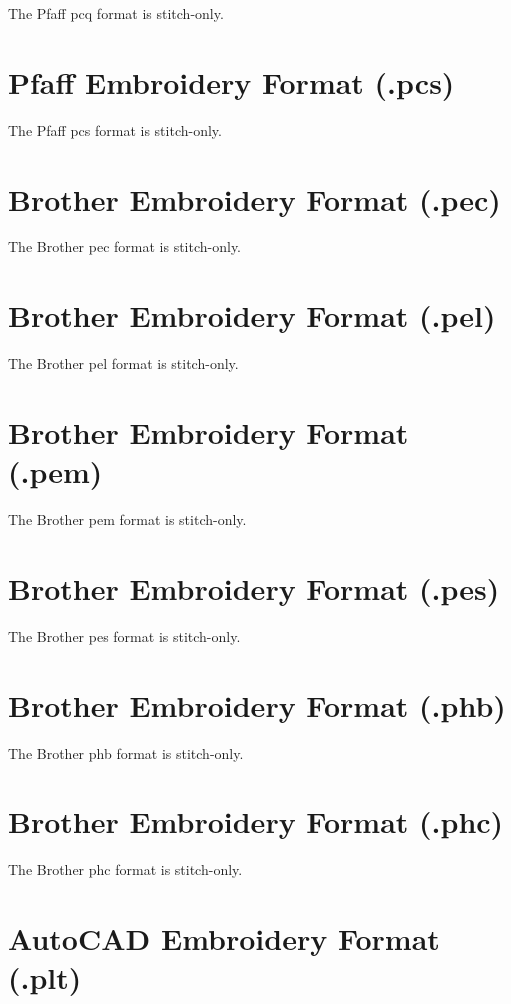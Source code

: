 \documentclass{report}
\begin{document}
The Pfaff pcq format is stitch-only.

\section{Pfaff Embroidery Format (.pcs)}

The Pfaff pcs format is stitch-only.

\section{Brother Embroidery Format (.pec)}

The Brother pec format is stitch-only.

\section{Brother Embroidery Format (.pel)}

The Brother pel format is stitch-only.

\section{Brother Embroidery Format (.pem)}

The Brother pem format is stitch-only.

\section{Brother Embroidery Format (.pes)}

The Brother pes format is stitch-only.

\section{Brother Embroidery Format (.phb)}

The Brother phb format is stitch-only.

\section{Brother Embroidery Format (.phc)}

The Brother phc format is stitch-only.

\section{AutoCAD Embroidery Format (.plt)}
\end{document}
